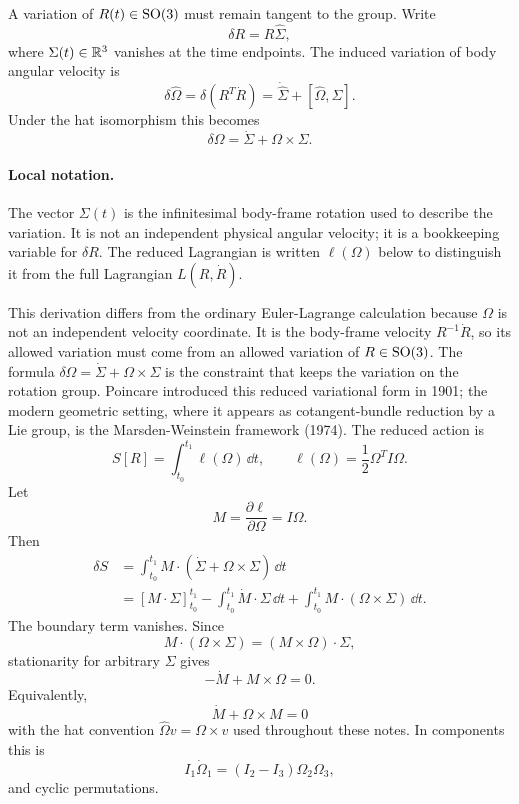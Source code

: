 A variation of \(R(t)\in\operatorname{SO}(3)\) must remain tangent to the group. Write
\[
  \delta R=R\widehat\Sigma,
\]
where \(\Sigma(t)\in\mathbb{R}^3\) vanishes at the time endpoints. The induced variation
of body angular velocity is
\[
  \delta\widehat\Omega
  =
  \delta(R^T\dot R)
  =
  \dot{\widehat\Sigma}+[\widehat\Omega,\widehat\Sigma].
\]
Under the hat isomorphism this becomes
\[
  \delta\Omega=\dot\Sigma+\Omega\times\Sigma.
\]

\paragraph{Local notation.}
The vector \(\Sigma(t)\) is the infinitesimal body-frame rotation used to
describe the variation.  It is not an independent physical angular velocity;
it is a bookkeeping variable for \(\delta R\).  The reduced Lagrangian is
written \(\ell(\Omega)\) below to distinguish it from the full Lagrangian
\(L(R,\dot R)\).

\begin{derivation}
This derivation differs from the ordinary Euler-Lagrange calculation because
\(\Omega\) is not an independent velocity coordinate. It is the body-frame
velocity \(R^{-1}\dot R\), so its allowed variation must come from an allowed
variation of \(R\in\operatorname{SO}(3)\). The formula
\(\delta\Omega=\dot\Sigma+\Omega\times\Sigma\) is the constraint that keeps the
variation on the rotation group. Poincare introduced this reduced variational
form in 1901; the modern geometric setting, where it appears as
cotangent-bundle reduction by a Lie group, is the Marsden-Weinstein framework
(1974).
The reduced action is
\[
  S[R]=\int_{t_0}^{t_1}\ell(\Omega)\,\dd t,
  \qquad
  \ell(\Omega)=\frac12\Omega^TI\Omega.
\]
Let
\[
  M=\frac{\partial \ell}{\partial \Omega}=I\Omega.
\]
Then
\[
\begin{aligned}
  \delta S
  &=
  \int_{t_0}^{t_1} M\cdot(\dot\Sigma+\Omega\times\Sigma)\,\dd t\\
  &=
  \left[M\cdot\Sigma\right]_{t_0}^{t_1}
  -
  \int_{t_0}^{t_1}\dot M\cdot\Sigma\,\dd t
  +
  \int_{t_0}^{t_1}M\cdot(\Omega\times\Sigma)\,\dd t.
\end{aligned}
\]
The boundary term vanishes. Since
\[
  M\cdot(\Omega\times\Sigma)=(M\times\Omega)\cdot\Sigma,
\]
stationarity for arbitrary \(\Sigma\) gives
\[
  -\dot M+M\times\Omega=0.
\]
Equivalently,
\[
  \boxed{\dot M+\Omega\times M=0}
\]
with the hat convention \(\widehat\Omega v=\Omega\times v\) used throughout
these notes. In components this is
\[
  I_1\dot\Omega_1=(I_2-I_3)\Omega_2\Omega_3,
\]
and cyclic permutations.
\end{derivation}

